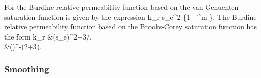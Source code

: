 For the Burdine relative permeability function based on the van Genuchten saturation function is given by the expression
\EQ\label{krl_burdine} 
k_{r} \eq s_e^2 \left\{1 - ^m \right\}. 
\EN 
The Burdine relative permeability function based on the Brooks-Corey saturation function has the form
\BA
k_r &\eq \big(s_e\big)^{2+3/\lambda},\\
&\eq \left(\right)^{-(2+3\lambda)}.
\EA

\subsubsection{Smoothing}

